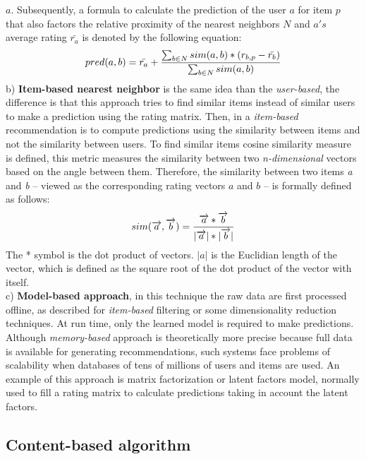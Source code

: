 $a$. Subsequently, a formula to calculate the prediction of the user
$a$ for item $p$ that also factors the relative proximity of the
nearest neighbors $N$ and $a's$ average rating $\bar{r_a}$ is denoted
by the following equation:
\begin{equation}\label{eq:prediction}
\displaystyle pred(a,b) = \bar{r_a} + 
{\sum_{b \in N} sim(a,b) * (r_{b,p}- \bar{r_b}) 
\over \sum_{b \in N} sim(a,b)} 
\end{equation}
b) \textbf{Item-based nearest neighbor} is the same idea than the \textit
{user-based}, the difference is that this approach tries to find
similar items instead of similar users to make a prediction using the rating
matrix. Then, in a \textit{item-based} recommendation is to compute
predictions using the similarity between items and not the similarity
between users. To find similar items cosine similarity measure is
defined, this metric measures the similarity between two
\textit{n-dimensional} vectors based on the angle between them.
Therefore, the similarity between two items \textit{a} and \textit{b}
– viewed as the corresponding rating vectors $a$ and $b$ – is formally
defined as follows:
\begin{equation}\label{eq:cosine}
\displaystyle sim(\overrightarrow{a},\overrightarrow{b})= 
{\overrightarrow{a}* \overrightarrow{b} \over
|\overrightarrow{a}|*|\overrightarrow{b}| }
\end{equation}
The * symbol is the dot product of vectors. $|a|$ is the Euclidian
length of the vector, which is defined as the square root of the dot
product of the vector with itself.\\  
c) \textbf{Model-based approach}, in this technique  the raw data are
first processed offline, as described for \textit {item-based}
filtering or some dimensionality reduction techniques. At run time,
only the learned model is required to make predictions. Although
\textit{memory-based} approach is theoretically more precise because
full data is available for generating recommendations, such systems
face problems of scalability when databases of tens of millions of
users and items are used. An example of this approach is matrix
factorization or latent factors model, normally used to fill a rating
matrix to calculate predictions taking in account the latent factors.

\subsection{Content-based algorithm}

